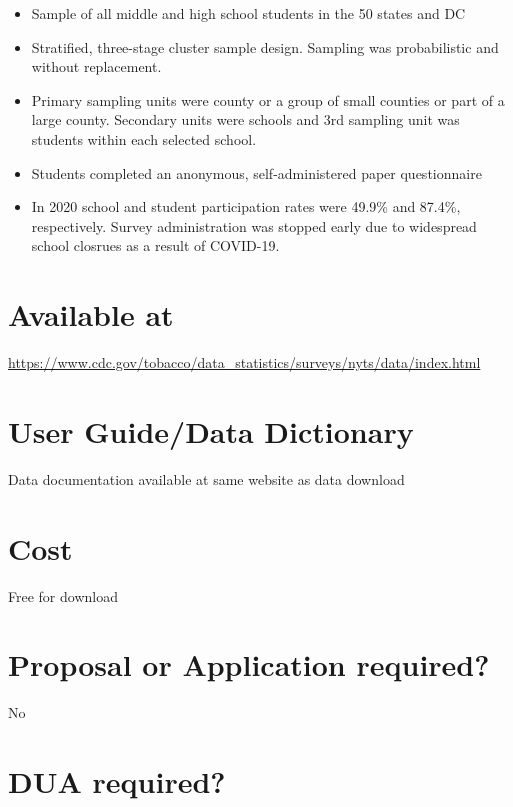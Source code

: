 \documentclass[
]{book}
\providecommand{\tightlist}{%
  \setlength{\itemsep}{0pt}\setlength{\parskip}{0pt}}
\begin{document}
\begin{itemize}
\tightlist
\item
  Sample of all middle and high school students in the 50 states and DC
\item
  Stratified, three-stage cluster sample design. Sampling was probabilistic and without replacement.
\item
  Primary sampling units were county or a group of small counties or part of a large county. Secondary units were schools and 3rd sampling unit was students within each selected school.
\item
  Students completed an anonymous, self-administered paper questionnaire
\item
  In 2020 school and student participation rates were 49.9\% and 87.4\%, respectively. Survey administration was stopped early due to widespread school closrues as a result of COVID-19.
\end{itemize}

\hypertarget{available-at-68}{%
\section{Available at}\label{available-at-68}}

\url{https://www.cdc.gov/tobacco/data_statistics/surveys/nyts/data/index.html}

\hypertarget{user-guidedata-dictionary-68}{%
\section{User Guide/Data Dictionary}\label{user-guidedata-dictionary-68}}

Data documentation available at same website as data download

\hypertarget{cost-68}{%
\section{Cost}\label{cost-68}}

Free for download

\hypertarget{proposal-or-application-required-68}{%
\section{Proposal or Application required?}\label{proposal-or-application-required-68}}

No

\hypertarget{dua-required-68}{%
\section{DUA required?}\label{dua-required-68}}
\end{document}
